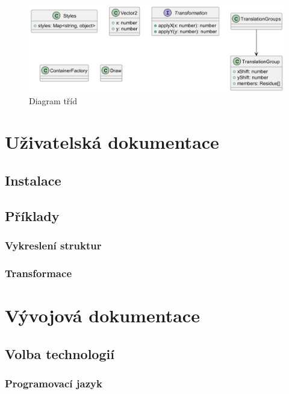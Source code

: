 \begin{figure}[H]
  \centering
  \includegraphics[width=145mm]{../img/kap03/others.png}
  \caption{Diagram tříd}
\end{figure}

\section{Uživatelská dokumentace}

\subsection{Instalace}



\subsection{Příklady}

\subsubsection{Vykreslení struktur}

\subsubsection{Transformace}

\section{Vývojová dokumentace}

\subsection{Volba technologií}

\subsubsection{Programovací jazyk}

